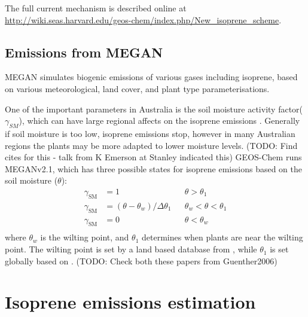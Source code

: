     The full current mechanism is described online at \url{http://wiki.seas.harvard.edu/geos-chem/index.php/New_isoprene_scheme}.
    
  \subsection{Emissions from MEGAN}
    MEGAN simulates biogenic emissions of various gases including isoprene, based on various meteorological, land cover, and plant type parameterisations.
    
    One of the important parameters in Australia is the soil moisture activity factor($\gamma_{SM}$), which can have large regional affects on the isoprene emissions \citep{Sindelarova2014,Bauwens2016}.
    Generally if soil moisture is too low, isoprene emissions stop, however in many Australian regions the plants may be more adapted to lower moisture levels. (TODO: Find cites for this - talk from K Emerson at Stanley indicated this)
    GEOS-Chem runs MEGANv2.1, which has three possible states for isoprene emissions based on the soil moisture ($\theta$):
    \begin{align*}
      \gamma_\mathrm{SM} & = 1 && \theta > \theta_1 \\
      \gamma_\mathrm{SM} & = (\theta-\theta_w)/\Delta\theta_1  && \theta_w < \theta < \theta_1 \\
      \gamma_\mathrm{SM} & = 0 && \theta < \theta_w \\
    \end{align*}
    where $\theta_w$ is the wilting point, and $\theta_1$ determines when plants are near the wilting point.
    The wilting point is set by a land based database from \citet{Chen2001}, while $\theta_1$ is set globally based on \citet{Pegoraro2004}. (TODO: Check both these papers  from Guenther2006)

\section{Isoprene emissions estimation}
\label{ch_isop:sec:IsopreneEmissions}

